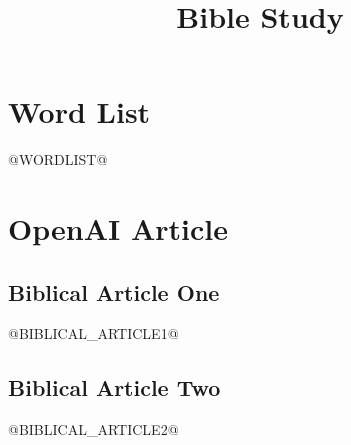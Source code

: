 \documentclass{article}
\title{
Bible Study
}
\begin{document}
\maketitle


\section{Word List}

@WORDLIST@


\section{OpenAI Article}

\subsection{Biblical Article One}
@BIBLICAL_ARTICLE1@

\subsection{Biblical Article Two}
@BIBLICAL_ARTICLE2@
\end{document}
